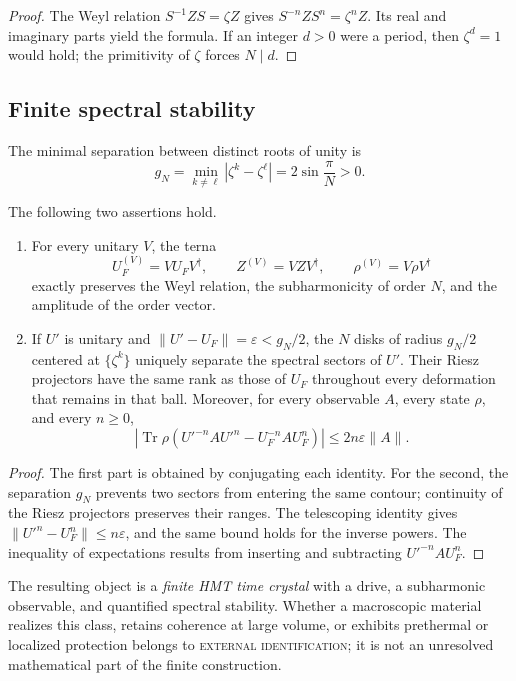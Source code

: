 \begin{proof}
The Weyl relation \(S^{-1} Z S=\zeta Z\) gives
\(S^{-n} Z S^n=\zeta^n Z\). Its real and imaginary parts yield the
formula. If an integer \(d>0\) were a period, then
\(\zeta^d=1\) would hold; the primitivity of \(\zeta\) forces \(N\mid d\).
\end{proof}

\subsection{Finite spectral stability}

The minimal separation between distinct roots of unity is
\[
 g_N=\min_{k\ne\ell}|\zeta^k-\zeta^\ell|
 =2\sin\frac{\pi}{N}>0.
\]

\begin{theorem}
\label{thm:hmtf2-estabilidad-cristal}
The following two assertions hold.

\begin{enumerate}
 \item For every unitary \(V\), the terna
 \[
  U_F^{(V)}=V U_F V^\dagger,\qquad
  Z^{(V)}=V Z V^\dagger,\qquad
  \rho^{(V)}=V\rho V^\dagger
 \]
 exactly preserves the Weyl relation, the subharmonicity of order \(N\), and
the amplitude of the order vector.
 \item If \(U'\) is unitary and
\(\|U'-U_F\|=\varepsilon<g_N/2\), the \(N\) disks of radius
\(g_N/2\) centered at \(\{\zeta^k\}\) uniquely separate the spectral sectors of
\(U'\). Their Riesz projectors have the same rank as those of
\(U_F\) throughout every deformation that remains in that ball.
Moreover, for every observable \(A\), every state \(\rho\), and every \(n\geq0\),
 \[
 \left|
 \operatorname{Tr}\rho\left(U'^{-n}AU'^n-U_F^{-n}AU_F^n\right)
 \right|
 \leq 2n\varepsilon\|A\|.
 \]
\end{enumerate}
\end{theorem}

\begin{proof}
The first part is obtained by conjugating each identity. For the second, the separation \(g_N\) prevents two sectors from entering the same contour; continuity of the Riesz projectors preserves their ranges. The telescoping identity gives \(\|U'^n-U_F^n\|\leq n\varepsilon\), and the same bound holds for the inverse powers. The inequality of expectations results from inserting and subtracting \(U'^{-n}AU_F^n\).
\end{proof}

The resulting object is a \emph{finite HMT time crystal} with a drive,
a subharmonic observable, and quantified spectral stability. Whether a
macroscopic material realizes this class, retains coherence at large volume, or
exhibits prethermal or localized protection belongs to
\textsc{external identification}; it is not an unresolved mathematical part of the
finite construction.


